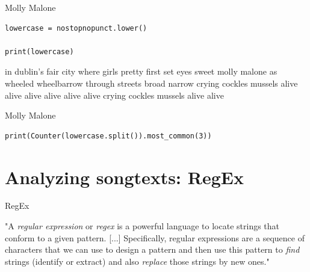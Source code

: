 \documentclass[handout]{beamer}
\begin{document}
\begin{frame}[fragile]{Molly Malone}
\begin{lstlisting}
lowercase = nostopnopunct.lower()

print(lowercase)
\end{lstlisting}

\begin{lstlistingoutput}
in dublin's fair city where girls pretty first set eyes sweet molly malone as wheeled wheelbarrow through streets broad narrow crying cockles mussels alive alive alive alive alive alive crying cockles mussels alive alive
\end{lstlistingoutput}

\end{frame}


\begin{frame}[fragile]{Molly Malone}
\begin{lstlisting}
print(Counter(lowercase.split()).most_common(3))
\end{lstlisting}

\begin{lstlistingoutput}
\end{lstlistingoutput}


\end{frame}


\section{Analyzing songtexts: RegEx}

\begin{frame}[fragile]{RegEx}
	
	"A \textit{regular expression} or \textit{regex} is a powerful language to locate strings that conform to a given pattern. [...] Specifically, regular expressions are a sequence of characters that we can use to design a pattern and then use this pattern to \textit{find} strings (identify or extract) and also \textit{replace} those strings by new ones." \\
	\begin{tiny}
		\cite{van_atteveldt_computational_2022} 
	\end{tiny}
	

\end{frame}
\end{document}
